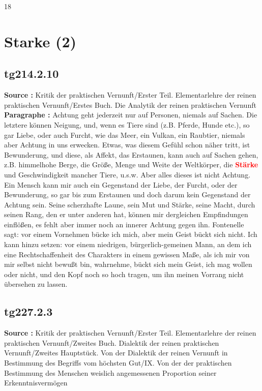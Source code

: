 \documentclass[a4paper,12pt,twoside]{book}
\newcommand{\match}[1]{\textcolor{red}{\textbf{#1}}}
\newcommand{\unnumberedsection}[1]{
	\section*{#1}
	\addcontentsline{toc}{section}{#1}
	\markright{#1}
}
\begin{document}
	
	18
	
	
	
	\unnumberedsection{Starke (2)} 
	\subsection*{tg214.2.10} 
	\textbf{Source : }Kritik der praktischen Vernunft/Erster Teil. Elementarlehre der reinen praktischen Vernunft/Erstes Buch. Die Analytik der reinen praktischen Vernunft\\  
	
	\noindent\textbf{Paragraphe : }
	Achtung geht jederzeit nur auf Personen, niemals auf Sachen. Die letztere können Neigung, und, wenn es Tiere sind (z.B. Pferde, Hunde etc.), so gar Liebe, oder auch Furcht, wie das Meer, ein Vulkan, ein Raubtier, niemals aber Achtung in uns erwecken. Etwas, was diesem Gefühl schon näher tritt, ist Bewunderung, und diese, als Affekt, das Erstaunen, kann auch auf Sachen gehen, z.B. himmelhohe Berge, die Größe, Menge und Weite der Weltkörper, die \match{Stärke} und Geschwindigkeit mancher Tiere, u.s.w. Aber alles dieses ist nicht Achtung. Ein Mensch kann mir auch ein Gegenstand der Liebe, der Furcht, oder der Bewunderung, so gar bis zum Erstaunen und doch darum kein Gegenstand der Achtung sein. Seine scherzhafte Laune, sein Mut und Stärke, seine Macht, durch seinen Rang, den er unter anderen hat, können mir dergleichen Empfindungen einflößen, es fehlt aber immer noch an innerer Achtung gegen ihn. Fontenelle sagt: vor einem Vornehmen bücke ich mich, aber mein Geist bückt sich nicht. Ich kann hinzu setzen: vor einem niedrigen, bürgerlich-gemeinen Mann, an dem ich eine Rechtschaffenheit des Charakters in einem gewissen Maße, als ich mir von mir selbst nicht bewußt bin, wahrnehme, bückt sich mein Geist, ich mag wollen oder nicht, und den Kopf noch so hoch tragen, um ihn meinen Vorrang nicht übersehen zu lassen. 
	
	\subsection*{tg227.2.3} 
	\textbf{Source : }Kritik der praktischen Vernunft/Erster Teil. Elementarlehre der reinen praktischen Vernunft/Zweites Buch. Dialektik der reinen praktischen Vernunft/Zweites Hauptstück. Von der Dialektik der reinen Vernunft in Bestimmung des Begriffs vom höchsten Gut/IX. Von der der praktischen Bestimmung des Menschen weislich angemessenen Proportion seiner Erkenntnisvermögen\\  
	
\end{document}
